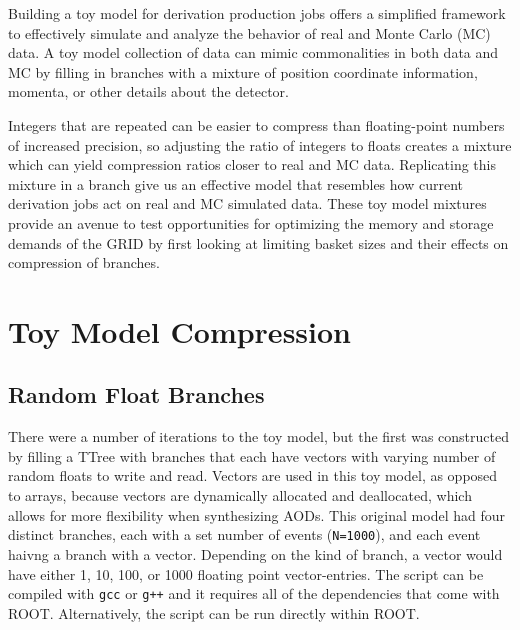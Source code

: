 Building a toy model for derivation production jobs offers a simplified framework to effectively simulate and analyze the behavior of real and Monte Carlo (MC) data.
A toy model collection of data can mimic commonalities in both data and MC by filling in branches with a mixture of position coordinate information, momenta, or other details about the detector.  

Integers that are repeated can be easier to compress than floating-point numbers of increased precision, so adjusting the ratio of integers to floats creates a mixture which can yield compression ratios closer to real and MC data.  
Replicating this mixture in a branch give us an effective model that resembles how current derivation jobs act on real and MC simulated data. 
These toy model mixtures provide an avenue to test opportunities for optimizing the memory and storage demands of the GRID by first looking at limiting basket sizes and their effects on compression of branches. 


\section{Toy Model Compression}

\subsection{Random Float Branches} \label{sec:toy_compression_random_float_branches}
There were a number of iterations to the toy model, but the first was constructed by filling a TTree with branches that each have vectors with varying number of random floats to write and read.
Vectors are used in this toy model, as opposed to arrays, because vectors are dynamically allocated and deallocated, which allows for more flexibility when synthesizing AODs. 
This original model had four distinct branches, each with a set number of events (\verb|N=1000|), and each event haivng a branch with a vector. 
Depending on the kind of branch, a vector would have either 1, 10, 100, or 1000 floating point vector-entries.
The script can be compiled with \verb|gcc| or \verb|g++| and it requires all of the dependencies that come with ROOT. 
Alternatively, the script can be run directly within ROOT.

